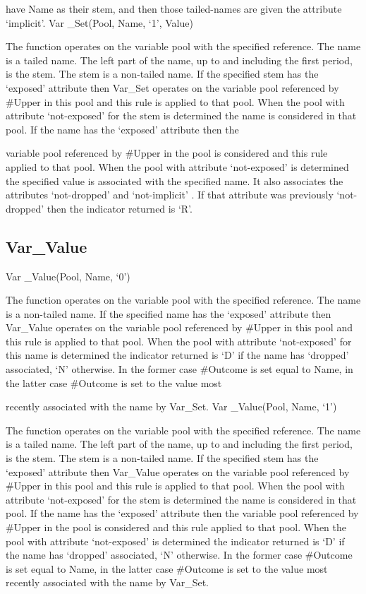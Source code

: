 have Name as their stem, and then those tailed-names are given the
attribute `implicit'. Var \_Set(Pool, Name, `1', Value)

The function operates on the variable pool with the specified reference.
The name is a tailed name. The left part of the name, up to and
including the first period, is the stem. The stem is a non-tailed name.
If the specified stem has the `exposed' attribute then Var\_Set operates
on the variable pool referenced by \#Upper in this pool and this rule is
applied to that pool. When the pool with attribute `not-exposed' for the
stem is determined the name is considered in that pool. If the name has
the `exposed' attribute then the

variable pool referenced by \#Upper in the pool is considered and this
rule applied to that pool. When the pool with attribute `not-exposed' is
determined the specified value is associated with the specified name. It
also associates the attributes `not-dropped' and `not-implicit' . If
that attribute was previously `not-dropped' then the indicator returned
is `R'.

\hypertarget{var_value}{%
\subsection{Var\_Value}\label{var_value}}

Var \_Value(Pool, Name, `0')

The function operates on the variable pool with the specified reference.
The name is a non-tailed name. If the specified name has the `exposed'
attribute then Var\_Value operates on the variable pool referenced by
\#Upper in this pool and this rule is applied to that pool. When the
pool with attribute `not-exposed' for this name is determined the
indicator returned is `D' if the name has `dropped' associated, `N'
otherwise. In the former case \#Outcome is set equal to Name, in the
latter case \#Outcome is set to the value most

recently associated with the name by Var\_Set. Var \_Value(Pool, Name,
`1')

The function operates on the variable pool with the specified reference.
The name is a tailed name. The left part of the name, up to and
including the first period, is the stem. The stem is a non-tailed name.
If the specified stem has the `exposed' attribute then Var\_Value
operates on the variable pool referenced by \#Upper in this pool and
this rule is applied to that pool. When the pool with attribute
`not-exposed' for the stem is determined the name is considered in that
pool. If the name has the `exposed' attribute then the variable pool
referenced by \#Upper in the pool is considered and this rule applied to
that pool. When the pool with attribute `not-exposed' is determined the
indicator returned is `D' if the name has `dropped' associated, `N'
otherwise. In the former case \#Outcome is set equal to Name, in the
latter case \#Outcome is set to the value most recently associated with
the name by Var\_Set.

